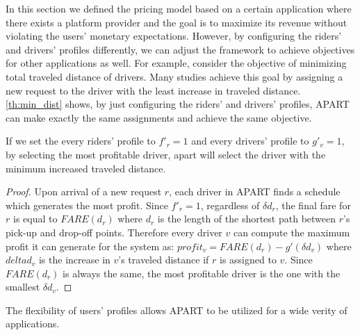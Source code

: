 In this section we defined the pricing model based on a certain application where there exists a platform provider and the goal is to maximize its revenue without violating the users' monetary expectations. However, by configuring the riders' and drivers' profiles differently, we can adjust the framework to achieve objectives for other applications as well. For example, consider the objective of minimizing total traveled distance of drivers. Many studies \cite{Ma13,Huang14,Ma15} achieve this goal by assigning a new request to the driver with the least increase in traveled distance. \cref{th:min_dist} shows, by just configuring the riders' and drivers' profiles, APART can make exactly the same assignments and achieve the same objective.

\begin{theorem}
\label{th:min_dist}
If we set the every riders' profile to $f'_r = 1$ and every drivers' profile to $g'_v = 1$, by selecting the most profitable driver, apart will select the driver with the minimum increased traveled distance.
\end{theorem}

\begin{proof}
Upon arrival of a new request $r$, each driver in APART finds a schedule which generates the most profit. Since $f'_r = 1$, regardless of $\delta d_r$, the final fare for $r$ is equal to $FARE(d_r)$ where $d_r$ is the length of the shortest path between $r$'s pick-up and drop-off points. Therefore every driver $v$ can compute the maximum profit it can generate for the system as: $profit_v = FARE(d_r) - g'(\delta d_v)$ where $delta d_v$ is the increase in $v$'s traveled distance if $r$ is assigned to $v$. Since $FARE(d_r)$ is always the same, the most profitable driver is the one with the smallest $\delta d_v$.
\end{proof}

The flexibility of users' profiles allows APART to be utilized for a wide verity of applications.